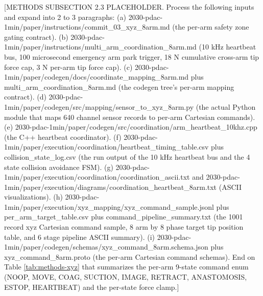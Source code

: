 [METHODS SUBSECTION 2.3 PLACEHOLDER. Process the following inputs and expand into 2 to 3 paragraphs:
(a) 2030-pdac-1min/paper/instructions/commit_03_xyz_8arm.md (the per-arm safety zone gating contract).
(b) 2030-pdac-1min/paper/instructions/multi_arm_coordination_8arm.md (10 kHz heartbeat bus, 100 microsecond emergency arm park trigger, 18 N cumulative cross-arm tip force cap, 3 N per-arm tip force cap).
(c) 2030-pdac-1min/paper/codegen/docs/coordinate_mapping_8arm.md plus multi_arm_coordination_8arm.md (the codegen tree's per-arm mapping contract).
(d) 2030-pdac-1min/paper/codegen/src/mapping/sensor_to_xyz_8arm.py (the actual Python module that maps 640 channel sensor records to per-arm Cartesian commands).
(e) 2030-pdac-1min/paper/codegen/src/coordination/arm_heartbeat_10khz.cpp (the C++ heartbeat coordinator).
(f) 2030-pdac-1min/paper/execution/coordination/heartbeat_timing_table.csv plus collision_state_log.csv (the run output of the 10 kHz heartbeat bus and the 4 state collision avoidance FSM).
(g) 2030-pdac-1min/paper/execution/coordination/coordination_ascii.txt and 2030-pdac-1min/paper/execution/diagrams/coordination_heartbeat_8arm.txt (ASCII visualizations).
(h) 2030-pdac-1min/paper/execution/xyz_mapping/xyz_command_sample.jsonl plus per_arm_target_table.csv plus command_pipeline_summary.txt (the 1001 record xyz Cartesian command sample, 8 arm by 8 phase target tip position table, and 6 stage pipeline ASCII summary).
(i) 2030-pdac-1min/paper/codegen/schemas/xyz_command_8arm.schema.json plus xyz_command_8arm.proto (the per-arm Cartesian command schemas).
End on Table \ref{tab:methods-xyz} that summarizes the per-arm 9-state command enum (NOOP, MOVE, COAG, SUCTION, IMAGE, RETRACT, ANASTOMOSIS, ESTOP, HEARTBEAT) and the per-state force clamp.]

